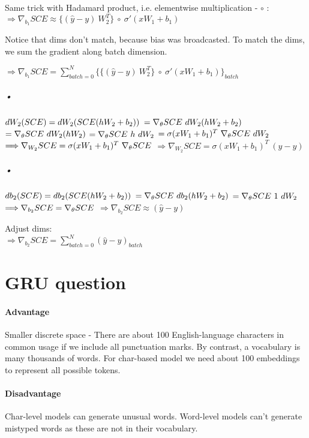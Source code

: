 \documentclass{article}
\begin{document}
Same trick with Hadamard product, i.e. elementwise multiplication - $\circ$ :\\
$\Longrightarrow \nabla_{b_1} SCE \approx \{ (\hat{y}-y) \ W_2^T \} \ \circ \ \sigma' (xW_1+b_1)$

Notice that dims don't match, because bias was broadcasted. To match the dims, we sum the gradient along batch dimension.

$\Longrightarrow \nabla_{b_1} SCE = \sum_{batch=0}^N \{ \{ (\hat{y}-y) \ W_2^T \} \ \circ \ \sigma' (xW_1+b_1)\} _{batch}$

\subparagraph{•}
$dW_2(SCE)=dW_2(SCE(hW_2+b_2)) \\$
$= \nabla_\theta SCE \ dW_2(hW_2+b_2) \\$
$= \nabla_\theta SCE \ dW_2(hW_2) \\$
$= \nabla_\theta SCE \ h \ dW_2 \\$
$= \sigma (xW_1+b_1)^T \ \nabla_\theta SCE \ dW_2 \\$
$\Longrightarrow \nabla_{W_2} SCE = \sigma (xW_1+b_1)^T \ \nabla_\theta SCE \\$
$\Longrightarrow \nabla_{W_2} SCE = \sigma (xW_1+b_1)^T \ (\hat{y}-y)$

\subparagraph{•}
$db_2(SCE)=db_2(SCE(hW_2+b_2)) \\$
$= \nabla_\theta SCE \ db_2(hW_2+b_2) \\$
$= \nabla_\theta SCE \ 1 \ dW_2 \\$
$\Longrightarrow \nabla_{b_2} SCE = \nabla_\theta SCE \\$
$\Longrightarrow \nabla_{b_2} SCE \approx (\hat{y}-y) $

Adjust dims:\\
$\Longrightarrow \nabla_{b_2} SCE = \sum_{batch=0}^N (\hat{y}-y)_{batch} $

\section{GRU question}
\paragraph{Advantage}
Smaller discrete space - There are about 100 English-language characters in common usage if we include all punctuation marks. By contrast, a vocabulary is many thousands of words. For char-based model we need about 100 embeddings to represent all possible tokens.

\paragraph{Disadvantage}
Char-level models can generate unusual words. Word-level models can't generate mistyped words as these are not in their vocabulary. 
\end{document}
